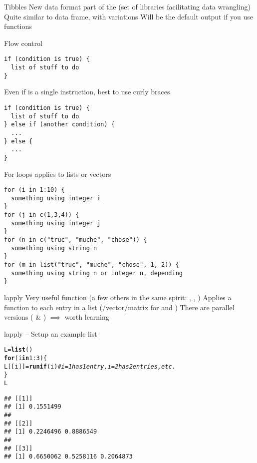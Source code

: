 \documentclass[aspectratio=169]{beamer}\usepackage[]{graphicx}\usepackage[]{xcolor}
\makeatletter
\newcommand{\hlnum}[1]{\textcolor[rgb]{0.686,0.059,0.569}{#1}}%
\newcommand{\hlcom}[1]{\textcolor[rgb]{0.678,0.584,0.686}{\textit{#1}}}%
\newcommand{\hlopt}[1]{\textcolor[rgb]{0,0,0}{#1}}%
\newcommand{\hldef}[1]{\textcolor[rgb]{0.345,0.345,0.345}{#1}}%
\newcommand{\hlkwa}[1]{\textcolor[rgb]{0.161,0.373,0.58}{\textbf{#1}}}%
\newcommand{\hlkwb}[1]{\textcolor[rgb]{0.69,0.353,0.396}{#1}}%
\newcommand{\hlkwd}[1]{\textcolor[rgb]{0.737,0.353,0.396}{\textbf{#1}}}%
\newenvironment{kframe}{%
 \def\at@end@of@kframe{}%
 \ifinner\ifhmode%
  \def\at@end@of@kframe{\end{minipage}}%
  \begin{minipage}{\columnwidth}%
 \fi\fi%
 \def\FrameCommand##1{\hskip\@totalleftmargin \hskip-\fboxsep
 \colorbox{shadecolor}{##1}\hskip-\fboxsep
     \hskip-\linewidth \hskip-\@totalleftmargin \hskip\columnwidth}%
 \MakeFramed {\advance\hsize-\width
   \@totalleftmargin\z@ \linewidth\hsize
   \@setminipage}}%
 {\par\unskip\endMakeFramed%
 \at@end@of@kframe}
\newenvironment{knitrout}{}{} %
\makeatother
\begin{document}
\begin{frame}{Tibbles}
\bbullet
New data format part of the  (set of libraries facilitating data wrangling)
\vfill
\bbullet
Quite similar to data frame, with variations
\vfill
\bbullet Will be the default output if you use  functions
\end{frame}


\begin{frame}[fragile]{Flow control}
\begin{lstlisting}
if (condition is true) {
  list of stuff to do
}
\end{lstlisting}
Even if  is a single instruction, best to use curly braces
\begin{lstlisting}
if (condition is true) {
  list of stuff to do
} else if (another condition) {
  ...
} else {
  ...
}
\end{lstlisting}
\end{frame} 

\begin{frame}[fragile]{For loops}
 applies to lists or vectors
\begin{lstlisting}
for (i in 1:10) {
  something using integer i
}
for (j in c(1,3,4)) {
  something using integer j
}
for (n in c("truc", "muche", "chose")) {
  something using string n
}
for (m in list("truc", "muche", "chose", 1, 2)) {
  something using string n or integer n, depending
}
\end{lstlisting}
\end{frame} 

\begin{frame}[fragile]{lapply}
Very useful function (a few others in the same spirit: , , )
\vfill
Applies a function to each entry in a list (/vector/matrix for  and )
\vfill
There are parallel versions ( \& ) $\implies$ worth learning
\end{frame}

\begin{frame}[fragile]{lapply -- Setup an example list}
\begin{knitrout}
\color{fgcolor}\begin{kframe}
\begin{alltt}
\hldef{L} \hlkwb{=} \hlkwd{list}\hldef{()}
\hlkwa{for} \hldef{(i} \hlkwa{in} \hlnum{1}\hlopt{:}\hlnum{3}\hldef{) \{}
        \hldef{L[[i]]} \hlkwb{=} \hlkwd{runif}\hldef{(i)} \hlcom{# i=1 has 1 entry, i=2 has 2 entries, etc.}
\hldef{\}}
\hldef{L}
\end{alltt}
\begin{verbatim}
## [[1]]
## [1] 0.1551499
## 
## [[2]]
## [1] 0.2246496 0.8886549
## 
## [[3]]
## [1] 0.6650062 0.5258116 0.2064873
\end{verbatim}
\end{kframe}
\end{knitrout}
\end{frame}
\end{document}
